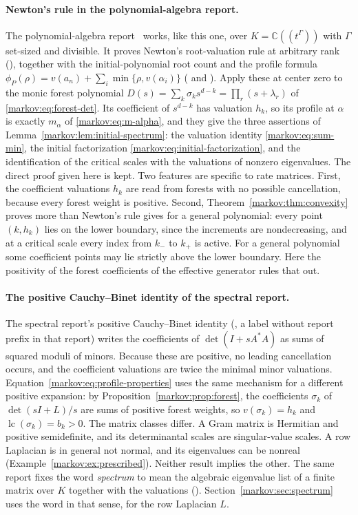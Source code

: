 \documentclass[11pt]{article}
\numberwithin{equation}{section}
\theoremstyle{definition}
\theoremstyle{remark}
\newcommand{\C}{\mathbb C}
\newcommand{\lc}{\operatorname{lc}}
\begin{document}
\paragraph{Newton's rule in the polynomial-algebra report.}
The polynomial-algebra report~\cite{CollPoly} works, like this one, over
$K=\C((t^\Gamma))$ with $\Gamma$ set-sized and divisible. It proves Newton's
root-valuation rule at arbitrary rank
(), together with the initial-polynomial root count
and the profile formula
$\phi_P(\rho)=v(a_n)+\sum_i\min\{\rho,v(\alpha_i)\}$
( and ).
Apply these at center zero to the monic forest polynomial
$D(s)=\sum_k\sigma_ks^{d-k}=\prod_r(s+\lambda_r)$ of
\eqref{markov:eq:forest-det}. Its coefficient of $s^{d-k}$ has valuation $h_k$,
so its profile at $\alpha$ is exactly $m_\alpha$ of \eqref{markov:eq:m-alpha},
and they give the three assertions of Lemma~\ref{markov:lem:initial-spectrum}:
the valuation identity \eqref{markov:eq:sum-min}, the initial factorization
\eqref{markov:eq:initial-factorization}, and the identification of the critical
scales with the valuations of nonzero eigenvalues. The direct proof given here is
kept. Two features are specific to rate matrices. First, the coefficient
valuations $h_k$ are read from forests with no possible cancellation, because
every forest weight is positive. Second, Theorem~\ref{markov:thm:convexity}
proves more than Newton's rule gives for a general polynomial: every point
$(k,h_k)$ lies on the lower boundary, since the increments are nondecreasing,
and at a critical scale every index from $k_-$ to $k_+$ is active. For a general
polynomial some coefficient points may lie strictly above the lower boundary.
Here the positivity of the forest coefficients of the effective generator rules
that out.

\paragraph{The positive Cauchy--Binet identity of the spectral report.}
The spectral report's positive Cauchy--Binet identity (, a label
without report prefix in that report) writes the coefficients of
$\det(I+sA^*A)$ as sums of squared moduli of minors. Because these are positive,
no leading cancellation occurs, and the coefficient valuations are twice the
minimal minor valuations. Equation~\eqref{markov:eq:profile-properties} uses the
same mechanism for a different positive expansion: by
Proposition~\ref{markov:prop:forest}, the coefficients $\sigma_k$ of
$\det(sI+L)/s$ are sums of positive forest weights, so $v(\sigma_k)=h_k$ and
$\lc(\sigma_k)=b_k>0$. The matrix classes differ. A Gram matrix is Hermitian
and positive semidefinite, and its determinantal scales are singular-value
scales. A row Laplacian is in general not normal, and its eigenvalues can be
nonreal (Example~\ref{markov:ex:prescribed}). Neither result implies the
other. The same report fixes the word \emph{spectrum} to mean the algebraic
eigenvalue list of a finite matrix over $K$ together with the valuations
(). Section~\ref{markov:sec:spectrum} uses the word
in that sense, for the row Laplacian $L$.
\end{document}
